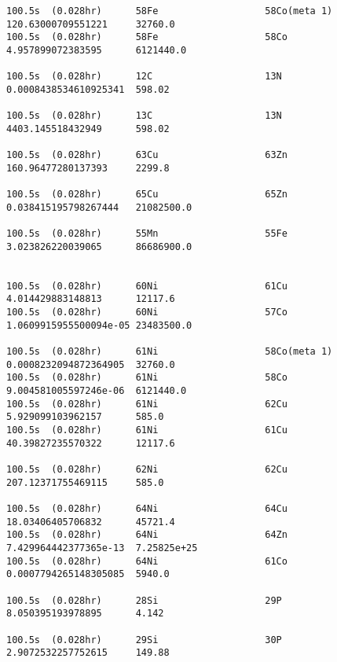 \begin{lstlisting}[style=sOutputFile,caption={Final results for steel irradiation},label={listing:alexsteel}]
100.5s  (0.028hr)      58Fe                   58Co(meta 1)           120.63000709551221     32760.0               
100.5s  (0.028hr)      58Fe                   58Co                   4.957899072383595      6121440.0             

100.5s  (0.028hr)      12C                    13N                    0.0008438534610925341  598.02                

100.5s  (0.028hr)      13C                    13N                    4403.145518432949      598.02                

100.5s  (0.028hr)      63Cu                   63Zn                   160.96477280137393     2299.8                

100.5s  (0.028hr)      65Cu                   65Zn                   0.038415195798267444   21082500.0            

100.5s  (0.028hr)      55Mn                   55Fe                   3.023826220039065      86686900.0            


100.5s  (0.028hr)      60Ni                   61Cu                   4.014429883148813      12117.6               
100.5s  (0.028hr)      60Ni                   57Co                   1.0609915955500094e-05 23483500.0            

100.5s  (0.028hr)      61Ni                   58Co(meta 1)           0.0008232094872364905  32760.0               
100.5s  (0.028hr)      61Ni                   58Co                   9.004581005597246e-06  6121440.0             
100.5s  (0.028hr)      61Ni                   62Cu                   5.929099103962157      585.0                 
100.5s  (0.028hr)      61Ni                   61Cu                   40.39827235570322      12117.6               

100.5s  (0.028hr)      62Ni                   62Cu                   207.12371755469115     585.0                 

100.5s  (0.028hr)      64Ni                   64Cu                   18.03406405706832      45721.4               
100.5s  (0.028hr)      64Ni                   64Zn                   7.429964442377365e-13  7.25825e+25           
100.5s  (0.028hr)      64Ni                   61Co                   0.0007794265148305085  5940.0                

100.5s  (0.028hr)      28Si                   29P                    8.050395193978895      4.142                 

100.5s  (0.028hr)      29Si                   30P                    2.9072532257752615     149.88                




\end{lstlisting}
